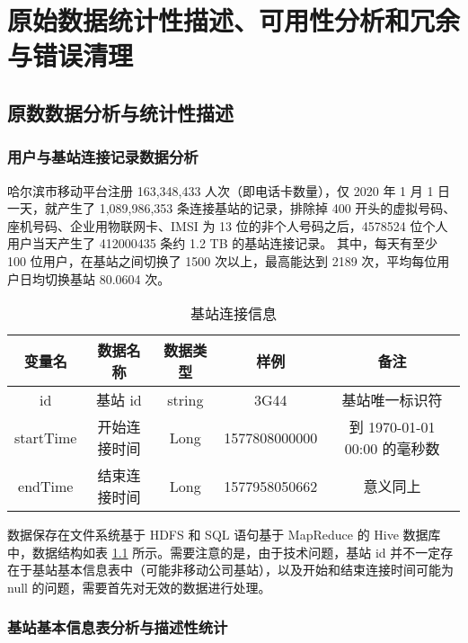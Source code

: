 
\chapter{原始数据统计性描述、可用性分析和冗余与错误清理}

\section{原数数据分析与统计性描述}

\subsection{用户与基站连接记录数据分析}

哈尔滨市移动平台注册 163,348,433 人次（即电话卡数量），仅 2020 年 1 月 1 日一天，就产生了 1,089,986,353 条连接基站的记录，排除掉 400 开头的虚拟号码、座机号码、企业用物联网卡、IMSI 为 13 位的非个人号码之后，4578524 位个人用户当天产生了 412000435 条约 1.2 TB 的基站连接记录。 其中，每天有至少 100 位用户，在基站之间切换了 1500 次以上，最高能达到 2189 次，平均每位用户日均切换基站 80.0604 次。

\begin{table}[htbp]
    \caption{基站连接信息}
    \vspace{0.5em}\centering\wuhao
    \begin{tabular}{ccccc}
        \toprule[1.5pt]
        变量名 & 数据名称 & 数据类型 & 样例 & 备注 \\
        \midrule[1pt]
        id & 基站 id & string & 3G44 & 基站唯一标识符 \\
        startTime & 开始连接时间 & Long & 1577808000000 & 到 1970-01-01 00:00 的毫秒数 \\
        endTime & 结束连接时间 & Long & 1577958050662 & 意义同上 \\
        \bottomrule[1.5pt]
    \end{tabular}
    \label{tab:cell_con}
\end{table}

数据保存在文件系统基于 HDFS 和 SQL 语句基于 MapReduce 的 Hive 数据库中，数据结构如表 \ref{tab:cell_con} 所示。需要注意的是，由于技术问题，基站 id 并不一定存在于基站基本信息表中（可能非移动公司基站），以及开始和结束连接时间可能为 null 的问题，需要首先对无效的数据进行处理。

\subsection{基站基本信息表分析与描述性统计}

